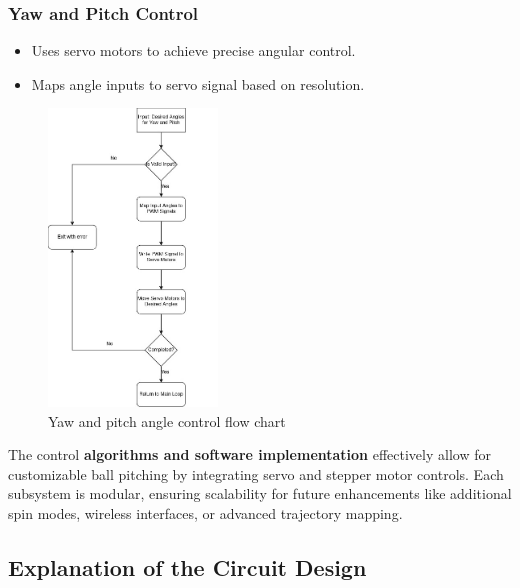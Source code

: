 \documentclass[12pt]{article}
\begin{document}
\subsubsection{Yaw and Pitch Control}
\begin{itemize}
    \item Uses servo motors to achieve precise angular control.
    \item Maps angle inputs to servo signal  based on resolution.
\end{itemize}

\begin{figure}[H]
    \centering
    \includegraphics[width=0.40\textwidth]{CH5 figureler/salih figureler/yaw and pitch control flow chart.jpg}
    \caption{Yaw and pitch angle control flow chart}
    \label{fig:Yaw and pitch angle control flow chart}
\end{figure}

The control \textbf{ algorithms and software implementation} effectively allow for customizable ball pitching by integrating servo and stepper motor controls. Each subsystem is modular, ensuring scalability for future enhancements like additional spin modes, wireless interfaces, or advanced trajectory mapping.

\subsection{Explanation of the Circuit Design}
\end{document}
